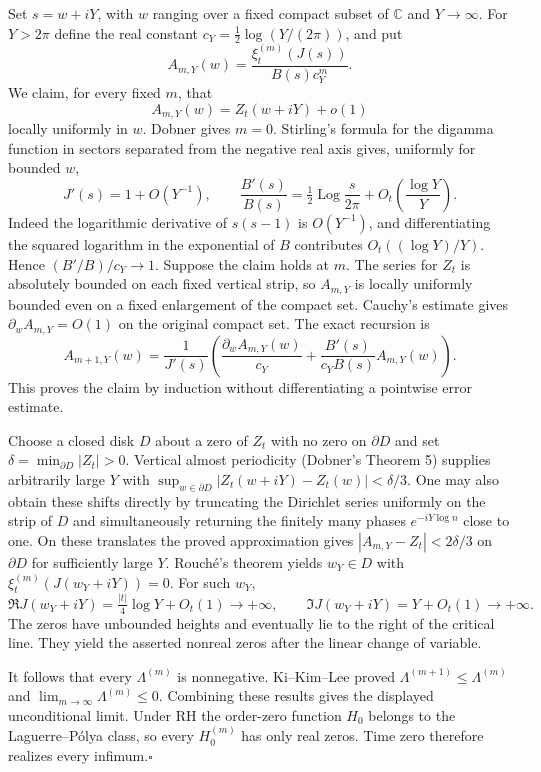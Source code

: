 \documentclass[11pt,a4paper]{article}
\begin{document}
Set $s=w+iY$, with $w$ ranging over a fixed compact subset of
$\mathbb C$ and $Y\to\infty$. For $Y>2\pi$ define the real constant
$c_Y=\tfrac12\log(Y/(2\pi))$, and put
\[
 A_{m,Y}(w)=\frac{\xi_t^{(m)}(J(s))}{B(s)c_Y^m}.
\]
We claim, for every fixed $m$, that
\[
 A_{m,Y}(w)=Z_t(w+iY)+o(1)
\]
locally uniformly in $w$. Dobner gives $m=0$. Stirling's formula
for the digamma function in sectors separated from the negative
real axis gives, uniformly for bounded $w$,
\[
 J'(s)=1+O(Y^{-1}),\qquad
 \frac{B'(s)}{B(s)}
  =\tfrac12\operatorname{Log}\frac{s}{2\pi}
       +O_t\!\left(\frac{\log Y}{Y}\right).
\]
Indeed the logarithmic derivative of $s(s-1)$ is $O(Y^{-1})$,
and differentiating the squared logarithm in the exponential of $B$
contributes $O_t((\log Y)/Y)$. Hence $(B'/B)/c_Y\to1$.
Suppose the claim holds at $m$. The series for $Z_t$ is absolutely
bounded on each fixed vertical strip, so $A_{m,Y}$ is locally uniformly
bounded even on a fixed enlargement of the compact set.
Cauchy's estimate gives $\partial_w A_{m,Y}=O(1)$ on the original
compact set. The exact recursion is
\[
 A_{m+1,Y}(w)=\frac{1}{J'(s)}
 \left(\frac{\partial_w A_{m,Y}(w)}{c_Y}+
       \frac{B'(s)}{c_Y B(s)}A_{m,Y}(w)\right).
\]
This proves the claim by induction without differentiating a
pointwise error estimate.

Choose a closed disk $D$ about a zero of $Z_t$ with no zero on
$\partial D$ and set $\delta=\min_{\partial D}|Z_t|>0$.
Vertical almost periodicity (Dobner's Theorem 5) supplies arbitrarily
large $Y$ with
$\sup_{w\in\partial D}|Z_t(w+iY)-Z_t(w)|<\delta/3$.
One may also obtain these shifts directly by truncating the Dirichlet
series uniformly on the strip of $D$ and simultaneously returning
the finitely many phases $e^{-iY\log n}$ close to one. On these
translates the proved approximation gives
$|A_{m,Y}-Z_t|<2\delta/3$ on $\partial D$ for sufficiently large $Y$.
Rouch\'e's theorem yields $w_Y\in D$ with
$\xi_t^{(m)}(J(w_Y+iY))=0$. For such $w_Y$,
\[
 \Re J(w_Y+iY)=\tfrac{|t|}{4}\log Y+O_t(1)\to+\infty,
 \qquad \Im J(w_Y+iY)=Y+O_t(1)\to+\infty .
\]
The zeros have unbounded heights and eventually lie to the right of
the critical line. They yield the asserted nonreal zeros after the
linear change of variable.

It follows that every $\Lambda^{(m)}$ is nonnegative.
Ki--Kim--Lee proved
$\Lambda^{(m+1)}\le\Lambda^{(m)}$ and
$\lim_{m\to\infty}\Lambda^{(m)}\le0$. Combining these results gives
the displayed unconditional limit. Under RH the order-zero function
$H_0$ belongs to the Laguerre--P\'olya class, so every $H_0^{(m)}$
has only real zeros. Time zero therefore realizes every infimum.\hfill$\square$
\end{document}
